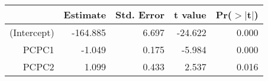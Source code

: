 \begin{table}[ht]
\centering
\begin{tabular}{rrrrr}
  \hline
 & Estimate & Std. Error & t value & Pr($>$$|$t$|$) \\ 
  \hline
(Intercept) & -164.885 & 6.697 & -24.622 & 0.000 \\ 
  PCPC1 & -1.049 & 0.175 & -5.984 & 0.000 \\ 
  PCPC2 & 1.099 & 0.433 & 2.537 & 0.016 \\ 
   \hline
\end{tabular}
\end{table}
